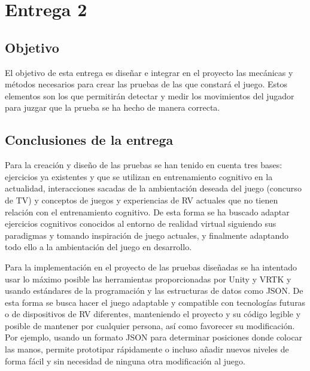 \section{Entrega 2}



\subsection{Objetivo}

El objetivo de esta entrega es diseñar e integrar en el proyecto las mecánicas y métodos necesarios para crear las pruebas de las que constará el juego. Estos elementos son los que permitirán detectar y medir los movimientos del jugador para juzgar que la prueba se ha hecho de manera correcta.











\subsection{Conclusiones de la entrega}


Para la creación y diseño de las pruebas se han tenido en cuenta tres bases: ejercicios ya existentes y que se utilizan en entrenamiento cognitivo en la actualidad, interacciones sacadas de la ambientación deseada del juego (concurso de TV) y conceptos de juegos y experiencias de RV actuales que no tienen relación con el entrenamiento cognitivo.
De esta forma se ha buscado adaptar ejercicios cognitivos conocidos al entorno de realidad virtual siguiendo sus paradigmas y tomando inspiración de juego actuales, y finalmente adaptando todo ello a la ambientación del juego en desarrollo. 

Para la implementación en el proyecto de las pruebas diseñadas se ha intentado usar lo máximo posible las herramientas proporcionadas por Unity y VRTK y usando estándares de la programación y las estructuras de datos como JSON. De esta forma se busca hacer el juego adaptable y compatible con tecnologías futuras o de dispositivos de RV diferentes, manteniendo el proyecto y su código legible y posible de mantener por cualquier persona, así como favorecer su modificación. Por ejemplo, usando un formato JSON para determinar posiciones donde colocar las manos, permite prototipar rápidamente o incluso añadir nuevos niveles de forma fácil y sin necesidad de ninguna otra modificación al juego.

